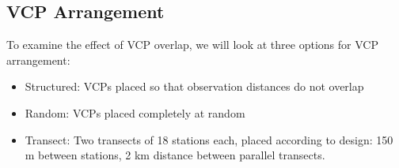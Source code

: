 \documentclass[12pt]{article}
\begin{document}
\subsection{VCP Arrangement}
\label{sec:layout}
To examine the effect of VCP overlap, we will look at three options for VCP arrangement:
\begin{itemize}
	\item Structured: VCPs placed so that observation distances do not overlap
	\item Random: VCPs placed completely at random
	\item Transect: Two transects of 18 stations each, placed according to \textcite{micronesian} design: 150 m between stations, 2 km distance between parallel transects.
\end{itemize}
\begin{figure}
	\centering


\end{figure}
\end{document}

